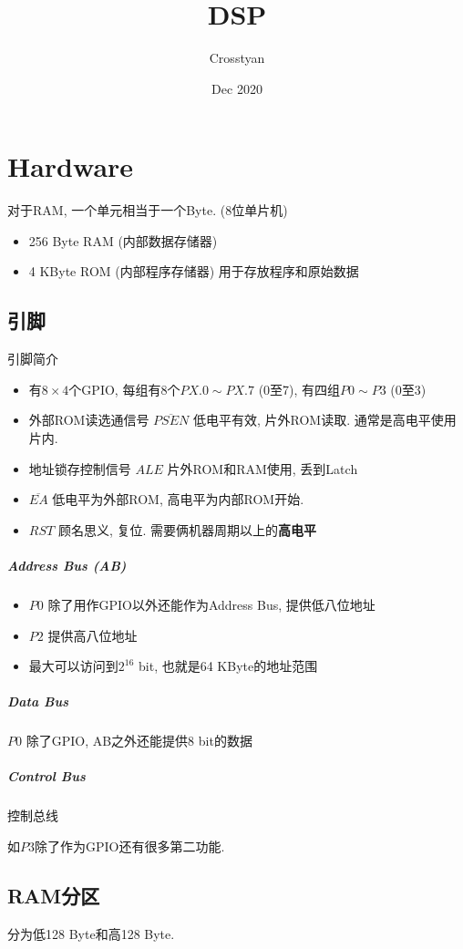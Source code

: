 \documentclass[a4paper]{report}
\title{DSP}
\author{Crosstyan}
\date{Dec 2020}
\begin{document}
\chapter{Hardware}
对于RAM, 一个单元相当于一个Byte. (8位单片机)
\begin{itemize}
  \item 256 Byte RAM (内部数据存储器)
  \item 4 KByte ROM (内部程序存储器) 用于存放程序和原始数据
\end{itemize}
\section{引脚}
引脚简介
\begin{itemize}
  \item 有$8 \times 4$个GPIO, 每组有8个$PX.0\sim PX.7$ (0至7), 有四组$P0\sim P3$ (0至3)
  \item 外部ROM读选通信号 $\overline{PSEN}$ 低电平有效, 片外ROM读取. 通常是高电平使用片内. 
  \item 地址锁存控制信号 $ALE$ 片外ROM和RAM使用, 丢到Latch
  \item $\overline{EA}$ 低电平为外部ROM, 高电平为内部ROM开始. 
  \item $RST$ 顾名思义, 复位. 需要俩机器周期以上的\textbf{高电平}
\end{itemize}
\paragraph{Address Bus (AB)}
\begin{itemize}
  \item $P0$ 除了用作GPIO以外还能作为Address Bus, 提供低八位地址
  \item $P2$ 提供高八位地址
  \item 最大可以访问到$2^{16}$ bit, 也就是64 KByte的地址范围
\end{itemize}
\paragraph{Data Bus} $P0$ 除了GPIO, AB之外还能提供8 bit的数据
\paragraph{Control Bus} 控制总线

如$P3$除了作为GPIO还有很多第二功能. 
\section{RAM分区}
分为低128 Byte和高128 Byte. 
\end{document}
